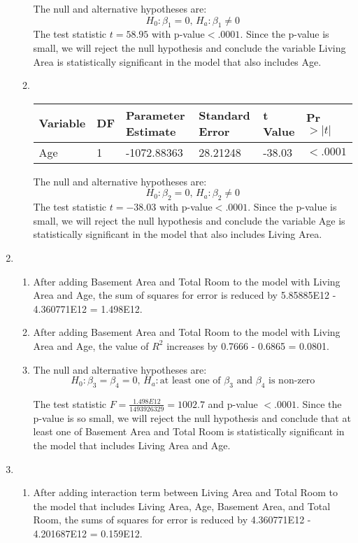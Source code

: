 \documentclass{article}
\begin{document}
\begin{enumerate}[leftmargin = 0 em, label = \arabic*., font = \bfseries]
\begin{enumerate}
		The null and alternative hypotheses are:
		\[H_0: \beta_1 = 0,\, H_a: \beta_1 \neq 0\]
		The test statistic $t = 58.95$ with p-value$ < .0001$. Since the p-value is small, we will reject the null hypothesis and conclude the variable Living Area is statistically significant in the model that also includes Age.


		\item \ 

				\begin{tabular}{llllll}
		\toprule
Variable&DF&Parameter Estimate&Standard Error&t Value&Pr $> |t|$\\
\midrule
Age&1&-1072.88363&28.21248&-38.03&$<.0001$\\
\bottomrule

		\end{tabular}

		The null and alternative hypotheses are:
		\[H_0: \beta_2 = 0,\, H_a: \beta_2 \neq 0\]
		The test statistic $t = -38.03$ with p-value$ < .0001$. Since the p-value is small, we will reject the null hypothesis and conclude the variable Age is statistically significant in the model that also includes Living Area.

	\end{enumerate}

	\item 
	\begin{enumerate}
		\item 
		After adding Basement Area and Total Room to the model with Living Area and Age, the sum of squares for error is reduced by 5.85885E12 - 4.360771E12 = 1.498E12.

		\item 
		After adding Basement Area and Total Room to the model with Living Area and Age, the value of $R^2$ increases by 0.7666 - 0.6865 = 0.0801.

		\item 
		The null and alternative hypotheses are:
		\[H_0: \beta_3 = \beta_4 = 0,\, H_a : \textrm{at least one of $\beta_3$ and $\beta_4$ is non-zero} \]

		The test statistic $F = \frac{1.498E12}{1493926329} = 1002.7$ and p-value $< .0001$. Since the p-value is so small, we will reject the null hypothesis and conclude that at least one of Basement Area and Total Room is statistically significant in the model that includes Living Area and Age.
	\end{enumerate}

\item
\begin{enumerate}
	\item 
	After adding interaction term between Living Area and Total Room to the model that includes Living Area, Age, Basement Area, and Total Room, the sums of squares for error is reduced by  4.360771E12 - 4.201687E12 = 0.159E12.


\end{enumerate}
\end{enumerate}
\end{document}
